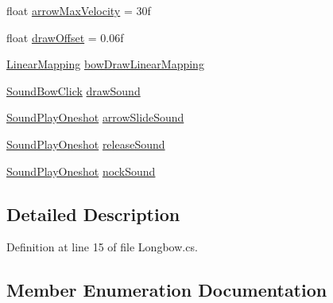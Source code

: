 \begin{DoxyCompactItemize}
\item 
float \mbox{\hyperlink{class_valve_1_1_v_r_1_1_interaction_system_1_1_longbow_aa70ecf34111c961f1807fb74c6332db7}{arrow\+Max\+Velocity}} = 30f
\item 
float \mbox{\hyperlink{class_valve_1_1_v_r_1_1_interaction_system_1_1_longbow_a4387570c5440d83e71d8087fadac7177}{draw\+Offset}} = 0.\+06f
\item 
\mbox{\hyperlink{class_valve_1_1_v_r_1_1_interaction_system_1_1_linear_mapping}{Linear\+Mapping}} \mbox{\hyperlink{class_valve_1_1_v_r_1_1_interaction_system_1_1_longbow_ac8567eb47c06e6daee08d40022ba86b6}{bow\+Draw\+Linear\+Mapping}}
\item 
\mbox{\hyperlink{class_valve_1_1_v_r_1_1_interaction_system_1_1_sound_bow_click}{Sound\+Bow\+Click}} \mbox{\hyperlink{class_valve_1_1_v_r_1_1_interaction_system_1_1_longbow_a86d5e6565e71ab26a6d58a9afd8ec685}{draw\+Sound}}
\item 
\mbox{\hyperlink{class_valve_1_1_v_r_1_1_interaction_system_1_1_sound_play_oneshot}{Sound\+Play\+Oneshot}} \mbox{\hyperlink{class_valve_1_1_v_r_1_1_interaction_system_1_1_longbow_a71748533e18de5815af1f19da1157c95}{arrow\+Slide\+Sound}}
\item 
\mbox{\hyperlink{class_valve_1_1_v_r_1_1_interaction_system_1_1_sound_play_oneshot}{Sound\+Play\+Oneshot}} \mbox{\hyperlink{class_valve_1_1_v_r_1_1_interaction_system_1_1_longbow_a16d66d2b39ae5cb1693cae811a3e28e4}{release\+Sound}}
\item 
\mbox{\hyperlink{class_valve_1_1_v_r_1_1_interaction_system_1_1_sound_play_oneshot}{Sound\+Play\+Oneshot}} \mbox{\hyperlink{class_valve_1_1_v_r_1_1_interaction_system_1_1_longbow_a4face5c164fc3db112f68557571c5f7f}{nock\+Sound}}
\end{DoxyCompactItemize}


\subsection{Detailed Description}


Definition at line 15 of file Longbow.\+cs.



\subsection{Member Enumeration Documentation}
\mbox{\label{class_valve_1_1_v_r_1_1_interaction_system_1_1_longbow_a1a13793c73b85cc47cc323af991169be}} 
